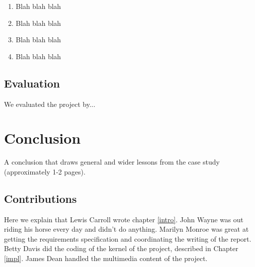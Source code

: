 \documentclass{l3proj}
\begin{document}
\begin{enumerate}
\item Blah blah blah
\item Blah blah blah
\item Blah blah blah
\item Blah blah blah
\end{enumerate}



\section{Evaluation}

We evaluated the project by...

\chapter{Conclusion}

A conclusion that draws general and wider lessons from the case study (approximately 1-2 pages).

\section{Contributions}

Here we explain that Lewis Carroll wrote chapter \ref{intro}. John Wayne
was out riding his horse every day and didn't do anything. Marilyn Monroe
was great at getting the requirements specification and coordinating the
writing of the report. Betty Davis did the coding of the kernel of the
project, described in Chapter \ref{impl}.  James Dean handled the
multimedia content of the project.



\end{document}
